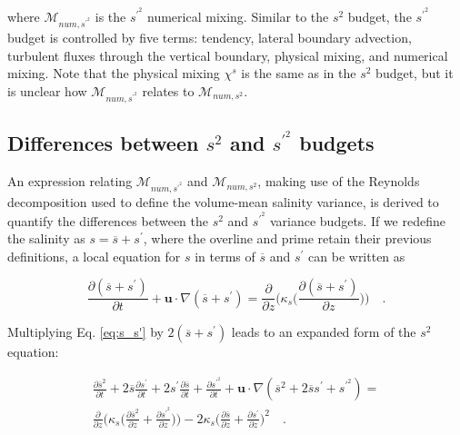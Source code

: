 \documentclass[draft]{agujournal2019}
\begin{document}
where $\mathcal{M}_{num, s^{\prime^2}}$ is the $s^{\prime^2}$ numerical mixing. Similar to the $s^2$ budget, the $s^{\prime^2}$ budget is controlled by five terms: tendency, lateral boundary advection, turbulent fluxes through the vertical boundary, physical mixing, and numerical mixing. Note that the physical mixing $\chi^s$ is the same as in the $s^2$ budget, but it is unclear how $\mathcal{M}_{num, s^{\prime^2}}$ relates to $\mathcal{M}_{num, s^2}$.

\subsection{Differences between $s^2$ and $s^{\prime^2}$ budgets}

An expression relating $\mathcal{M}_{num, s^{\prime^2}}$ and $\mathcal{M}_{num, s^2}$, making use of the Reynolds decomposition used to define the volume-mean salinity variance, is derived to quantify the differences between the $s^2$ and $s^{\prime^2}$ variance budgets. If we redefine the salinity as $s = \overline{s}+s^\prime$, where the overline and prime retain their previous definitions, a local equation for $s$ in terms of $\overline{s}$ and $s^\prime$ can be written as
\begin{linenomath*}
\begin{equation} \label{eq:s_s'}
    \frac{\partial (\overline{s}+ s^\prime)}{\partial t}+ \textbf{u} \cdot \nabla(\overline{s}+ s^\prime) = \frac{\partial}{\partial z} \bigg(\kappa_s \bigg(\frac{\partial (\overline{s}+ s^\prime)}{\partial z} \bigg) \bigg) \quad .
\end{equation}
\end{linenomath*}
Multiplying Eq. \ref{eq:s_s'} by $2(\overline{s}+s^\prime)$ leads to an expanded form of the $s^2$ equation:
\begin{linenomath*}
\begin{equation} \label{eq:s_s'_exanded}
    \begin{split}
        \frac{\partial \overline{s}^2}{\partial t} + 2\overline{s} \frac{\partial s^\prime}{\partial t} +2s^\prime \frac{\partial \overline{s}}{\partial t} + \frac{\partial s^{\prime^2}}{\partial t}+
        \textbf{u} \cdot \nabla(\overline{s}^2+2 \overline{s} s^\prime+s^{\prime^2}) = \\
        \frac{\partial}{\partial z} \bigg(\kappa_s \bigg(\frac{\partial \overline{s}^2}{\partial z} + \frac{\partial s^{\prime^2}}{\partial z} \bigg) \bigg) -2 \kappa_s \bigg(\frac{\partial \overline{s}}{\partial z} + \frac{\partial s^\prime}{\partial z} \bigg)^{2} \quad .
    \end{split}
\end{equation}
\end{linenomath*}
\end{document}
